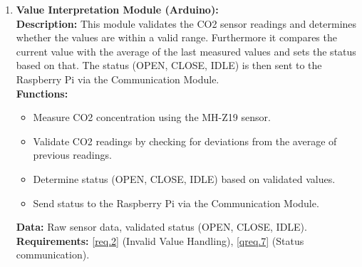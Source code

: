 \begin{enumerate}
    \item \textbf{Value Interpretation Module (Arduino):} \\ 
        \textbf{Description:} This module validates the CO2 sensor readings and determines whether the values are within a valid range. Furthermore it compares the current value with the average of the last measured values and sets the status based on that. The status (OPEN, CLOSE, IDLE) is then sent to the Raspberry Pi via the Communication Module. \\ 
        \textbf{Functions:}
        \begin{itemize}
            \item Measure CO2 concentration using the MH-Z19 sensor.
            \item Validate CO2 readings by checking for deviations from the average of previous readings.
            \item Determine status (OPEN, CLOSE, IDLE) based on validated values.
            \item Send status to the Raspberry Pi via the Communication Module.
        \end{itemize}
        \textbf{Data:} Raw sensor data, validated status (OPEN, CLOSE, IDLE). \\ 
        \textbf{Requirements:} \ref{req.2} (Invalid Value Handling), \ref{qreq.7} (Status communication).

\end{enumerate}
\newpage
